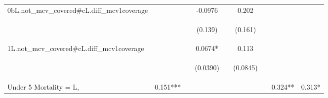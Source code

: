 \documentclass[]{article}
\begin{document}
\begin{center}
\begin{tabular}{lcccccccc}
0bL.not\_mcv\_covered\#cL.diff\_mcv1coverage &  &  & -0.0976 &  & 0.202 &  &  &  \\
\vspace{4pt} & \begin{footnotesize}\end{footnotesize} & \begin{footnotesize}\end{footnotesize} & \begin{footnotesize}(0.139)\end{footnotesize} & \begin{footnotesize}\end{footnotesize} & \begin{footnotesize}(0.161)\end{footnotesize} & \begin{footnotesize}\end{footnotesize} & \begin{footnotesize}\end{footnotesize} & \begin{footnotesize}\end{footnotesize} \\
1L.not\_mcv\_covered\#cL.diff\_mcv1coverage &  &  & 0.0674* &  & 0.113 &  &  &  \\
\vspace{4pt} & \begin{footnotesize}\end{footnotesize} & \begin{footnotesize}\end{footnotesize} & \begin{footnotesize}(0.0390)\end{footnotesize} & \begin{footnotesize}\end{footnotesize} & \begin{footnotesize}(0.0845)\end{footnotesize} & \begin{footnotesize}\end{footnotesize} & \begin{footnotesize}\end{footnotesize} & \begin{footnotesize}\end{footnotesize} \\
Under 5 Mortality = L, & 0.151*** &  &  &  &  &  & 0.324** & 0.313* \\

\end{tabular}
\end{center}
\end{document}
